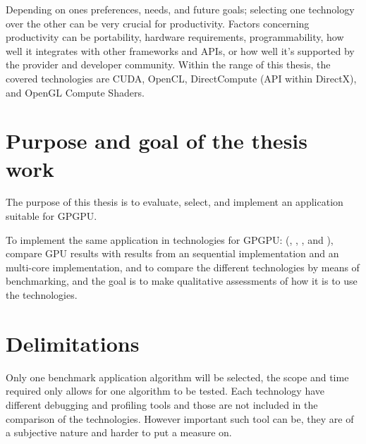 Depending on ones preferences, needs, and future goals; selecting one technology over the other can be very crucial for productivity. Factors concerning productivity can be portability, hardware requirements, programmability, how well it integrates with other frameworks and \gls{API}s, or how well it's supported by the provider and developer community. Within the range of this thesis, the covered technologies are \gls{CUDA}, \gls{OpenCL}, DirectCompute (\gls{API} within DirectX), and \gls{OpenGL} Compute Shaders.

\section{Purpose and goal of the thesis work}
The purpose of this thesis is to evaluate, select, and implement an application suitable for \gls{GPGPU}.

To implement the same application in technologies for \gls{GPGPU}: ({\CU}, {\OCL}, {\DX}, and {\GL}), compare \gls{GPU} results with results from an sequential {\CPP} implementation and an multi-core {\OMP} implementation, and to compare the different technologies by means of benchmarking, and the goal is to make qualitative assessments of how it is to use the technologies.

\section{Delimitations}
Only one benchmark application algorithm will be selected, the scope and time required only allows for one algorithm to be tested. Each technology have different debugging and profiling tools and those are not included in the comparison of the technologies. However important such tool can be, they are of a subjective nature and harder to put a measure on.